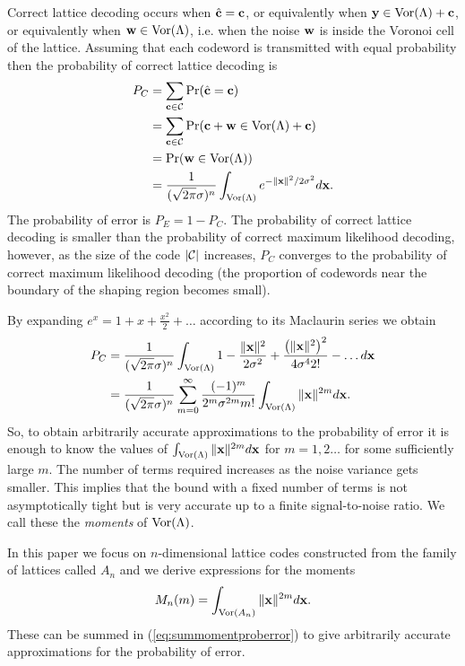 \documentclass[journal, onecolumn, 11pt]{IEEEtran}
\begin{document}
Correct lattice decoding occurs when $\hat{\mathbf{c}} = \mathbf{c}$, or equivalently when $\mathbf{y} \in \operatorname{Vor}(\Lambda) + \mathbf{c}$, or equivalently when $\mathbf{w} \in \operatorname{Vor}(\Lambda)$, i.e. when the noise $\mathbf{w}$ is inside the Voronoi cell of the lattice.  Assuming that each codeword is transmitted with equal probability then the probability of correct lattice decoding is
\begin{align}
P_C &= \sum_{\cbf \in \calC} \prob( \hat{\cbf} = \cbf ) \\
&= \sum_{\cbf\in \calC} \prob( \cbf + \wbf \in \vor(\Lambda) + \cbf )  \nonumber \\
&= \prob(\wbf \in \vor(\Lambda) ) \nonumber \\
&=   \frac{1}{(\sqrt{2\pi}\sigma)^n} \int_{\vor(\Lambda)}e^{-\|\xbf\|^2 / 2\sigma^2 } d\xbf. \label{eq:PEgaussian}
\end{align}
The probability of error is $P_E = 1 - P_C$.  The probability of correct lattice decoding is smaller than the probability of correct maximum likelihood decoding, however, as the size of the code ${\left| \mathcal C \right|}$ increases, $P_C$ converges to the probability of correct maximum likelihood decoding (the proportion of codewords near the boundary of the shaping region becomes small).

By expanding $e^x = 1  + x + \frac{x^2}{2} + \dots$ according to its Maclaurin series we obtain
\begin{align}
P_C  &= \frac{1}{(\sqrt{2\pi}\sigma)^n}\int_{\vor(\Lambda)} 1
- \frac{\|\xbf\|^2}{2\sigma^2} + \frac{\left(\|\xbf\|^2\right)^2}{
4\sigma^42!} - \dots d\xbf \nonumber \\
&= \frac{1}{(\sqrt{2\pi}\sigma)^n} \sum_{m=0}^\infty
\frac{(-1)^m}{2^m\sigma^{2m}m!} \int_{\vor(\Lambda)} \|\xbf\|^{2m}
d\xbf.  \label{eq:summomentproberror}
\end{align}
So, to obtain arbitrarily accurate approximations to the probability of error it is enough to know the values of $\int_{\operatorname{Vor}(\Lambda)} \|\mathbf{x}\|^{2m} d\mathbf{x}$ for $m=1,2\dots$ for some sufficiently large $m$.  The number of terms required increases as the noise variance gets smaller.  This implies that the bound with a fixed number of terms is not asymptotically tight but is very accurate up to a finite signal-to-noise ratio.  We call these the \emph{moments} of $\operatorname{Vor}(\Lambda)$.

\newcommand{\calM}{M}
In this paper we focus on $n$-dimensional lattice codes constructed from the family of lattices called $A_n$ and we derive expressions for the moments
\[
 \calM_n(m) = \int_{\vor(A_n)} \|\xbf\|^{2m} d\xbf.
\]
These can be summed in (\ref{eq:summomentproberror}) to give arbitrarily accurate approximations for the probability of error.
\end{document}
